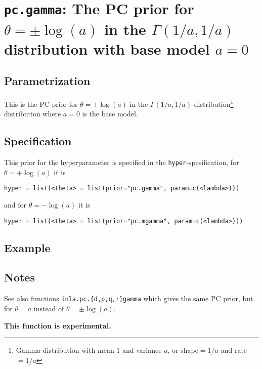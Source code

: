 \documentclass[a4paper,11pt]{article}
\begin{document}
\section*{\texttt{pc.gamma}: The PC prior for $\theta = \pm\log(a)$ in the
    $\Gamma(1/a,1/a)$ distribution with base model $a=0$}

\subsection*{Parametrization}

This is the PC prior for $\theta = \pm\log(a)$ in the
$\Gamma(1/a,1/a)$ distribution\footnote{Gamma distribution with mean
    $1$ and variance $a$, or shape$=1/a$ and rate$=1/a$} distribution
where $a=0$ is the base model.

\subsection*{Specification}
This prior for the hyperparameter is specified in the
\texttt{hyper}-spesification, for $\theta = +\log(a)$ it is
\begin{center}
    \texttt{hyper = list(<theta> = list(prior="pc.gamma", param=c(<lambda>)))}
\end{center}
and for $\theta = -\log(a)$ it is
\begin{center}
    \texttt{hyper = list(<theta> = list(prior="pc.mgamma", param=c(<lambda>)))}
\end{center}

\subsection*{Example}

\subsection*{Notes}

See also functions \texttt{inla.pc.\{d,p,q,r\}gamma} which gives the
same PC prior, but for $\theta = a$ instead of $\theta = \pm\log(a)$.

\noindent\textbf{This function is experimental.}
\end{document}
